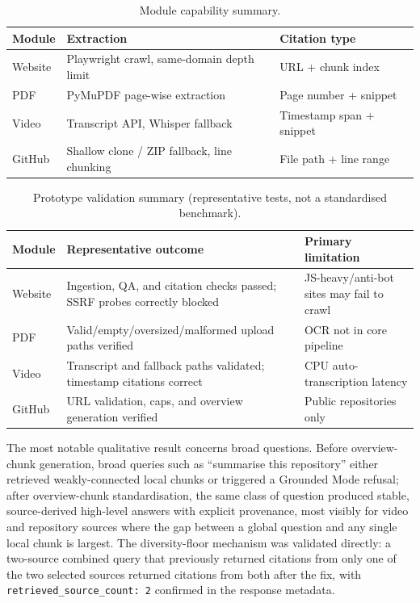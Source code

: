 \documentclass[conference]{IEEEtran}
\begin{document}
\begin{table}[t]
\caption{Module capability summary.}
\label{tab:modules}
\centering
\begin{tabular}{p{1.1cm}p{2.4cm}p{3.6cm}}
\hline
\textbf{Module} & \textbf{Extraction} & \textbf{Citation type} \\
\hline
Website & Playwright crawl, same-domain depth limit & URL + chunk index \\
PDF & PyMuPDF page-wise extraction & Page number + snippet \\
Video & Transcript API, Whisper fallback & Timestamp span + snippet \\
GitHub & Shallow clone / ZIP fallback, line chunking & File path + line range \\
\hline
\end{tabular}
\end{table}

\begin{table}[t]
\caption{Prototype validation summary (representative tests, not a standardised benchmark).}
\label{tab:validation}
\centering
\begin{tabular}{p{1.1cm}p{3.6cm}p{2.4cm}}
\hline
\textbf{Module} & \textbf{Representative outcome} & \textbf{Primary limitation} \\
\hline
Website & Ingestion, QA, and citation checks passed; SSRF probes correctly blocked & JS-heavy/anti-bot sites may fail to crawl \\
PDF & Valid/empty/oversized/malformed upload paths verified & OCR not in core pipeline \\
Video & Transcript and fallback paths validated; timestamp citations correct & CPU auto-transcription latency \\
GitHub & URL validation, caps, and overview generation verified & Public repositories only \\
\hline
\end{tabular}
\end{table}

The most notable qualitative result concerns broad questions. Before
overview-chunk generation, broad queries such as ``summarise this
repository'' either retrieved weakly-connected local chunks or triggered
a Grounded Mode refusal; after overview-chunk standardisation, the same
class of question produced stable, source-derived high-level answers
with explicit provenance, most visibly for video and repository sources
where the gap between a global question and any single local chunk is
largest. The diversity-floor mechanism was validated directly: a
two-source combined query that previously returned citations from only
one of the two selected sources returned citations from both after the
fix, with \texttt{retrieved\_source\_count: 2} confirmed in the response
metadata.
\end{document}
